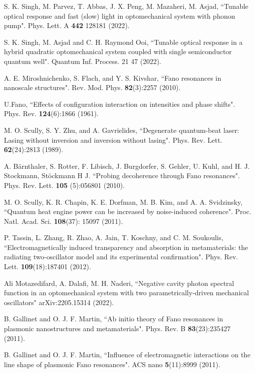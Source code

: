 \documentclass[aps,pra,superscriptaddress,balancelastpage,twocolumn]{revtex4}
\begin{document}
\begin{thebibliography}{99}
 S. K. Singh, M. Parvez, T. Abbas, J. X. Peng, M. Mazaheri, M.
Asjad, ``Tunable optical response and fast (slow) light in optomechanical
system with phonon pump". Phys. Lett. A \textbf{442} 128181 (2022).

 S. K. Singh, M. Asjad and C. H. Raymond Ooi, ``Tunable
optical response in a hybrid quadratic optomechanical system coupled with
single semiconductor quantum well". Quantum Inf. Process. 21 47 (2022).

 A. E. Miroshnichenko, S. Flach, and Y. S. Kivshar, ``Fano
resonances in nanoscale structures". Rev. Mod. Phys. \textbf{82}(3):2257
(2010).

 U.Fano, ``Effects of configuration interaction on intensities
and phase shifts". Phys. Rev. \textbf{124}(6):1866 (1961).

 M. O. Scully, S. Y. Zhu, and A. Gavrielides, ``Degenerate
quantum-beat laser: Lasing without inversion and inversion without lasing".
Phys. Rev. Lett. \textbf{62}(24):2813 (1989).

 A. B\"{a}rnthaler, S. Rotter, F. Libisch, J. Burgdorfer, S.
Gehler, U. Kuhl, and H. J. Stockmann, St\"{o}ckmann H J. ``Probing
decoherence through Fano resonances". Phys. Rev. Lett. \textbf{105}%
(5):056801 (2010).

 M. O. Scully, K. R. Chapin, K. E. Dorfman, M. B. Kim, and A.
A. Svidzinsky, ``Quantum heat engine power can be increased by noise-induced
coherence". Proc. Natl. Acad. Sci. \textbf{108}(37): 15097 (2011).

 P. Tassin, L. Zhang, R. Zhao, A. Jain, T. Koschny, and C. M.
Soukoulis, ``Electromagnetically induced transparency and absorption in
metamaterials: the radiating two-oscillator model and its experimental
confirmation". Phys. Rev. Lett. \textbf{109}(18):187401 (2012).

 Ali Motazedifard, A. Dalafi, M. H. Naderi, ``Negative cavity
photon spectral function in an optomechanical system with two
parametrically-driven mechanical oscillators" arXiv:2205.15314 (2022).

 B. Gallinet and O. J. F. Martin, ``Ab initio theory of Fano
resonances in plasmonic nanostructures and metamaterials". Phys. Rev. B
\textbf{83}(23):235427 (2011).

 B. Gallinet and O. J. F. Martin, ``Influence of
electromagnetic interactions on the line shape of plasmonic Fano
resonances". ACS nano \textbf{5}(11):8999 (2011).


\end{thebibliography}
\end{document}
